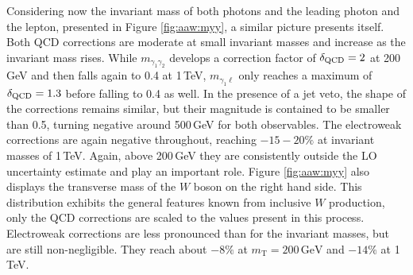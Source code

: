 Considering now the invariant mass of both photons 
and the leading photon and the lepton, presented in 
Figure \ref{fig:aaw:myy}, a similar picture 
presents itself. 
Both QCD corrections are moderate at small invariant 
masses and increase as the invariant mass rises. 
While $m_{\gamma_1\gamma_2}$ develops a correction 
factor of $\delta_\text{QCD}=2$ at 200\,GeV and then falls 
again to 0.4 at 1\,TeV, $m_{\gamma_1\ell}$ only 
reaches a maximum of $\delta_\text{QCD}=1.3$ before falling 
to 0.4 as well. 
In the presence of a jet veto, the shape of the corrections 
remains similar, but their magnitude is contained to 
be smaller than 0.5, turning negative around 500\,GeV 
for both observables. 
The electroweak corrections are again negative 
throughout, reaching $-15-20\%$ at invariant masses 
of 1\,TeV.
Again, above 200\,GeV they are consistently outside 
the LO uncertainty estimate and play an important 
role. 
Figure \ref{fig:aaw:myy} also displays the transverse 
mass of the $W$ boson on the right hand side. 
This distribution exhibits the general features known 
from inclusive $W$ production, only the QCD corrections 
are scaled to the values present in this process.
Electroweak corrections are less pronounced than for 
the invariant masses, but are still non-negligible. 
They reach about $-8\%$ at $m_\text{T}=200\,\text{GeV}$ 
and $-14\%$ at 1\,TeV.


